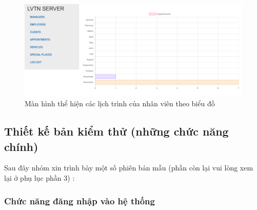 \documentclass{article}
\begin{document}
\begin{figure}[H]
\centering
\includegraphics[scale=0.5]{admin_lichtrinhchart}
\caption{Màn hình thể hiện các lịch trình của nhân viên theo biểu đồ}
\end{figure}


\subsection{Thiết kế bản kiểm thử (những chức năng chính)}
Sau đây nhóm xin trình bày một số phiên bản mẫu (phần còn lại vui lòng xem lại ở phụ lục phần 3) : 
\subsubsection {Chức năng đăng nhập vào hệ thống}
\end{document}
